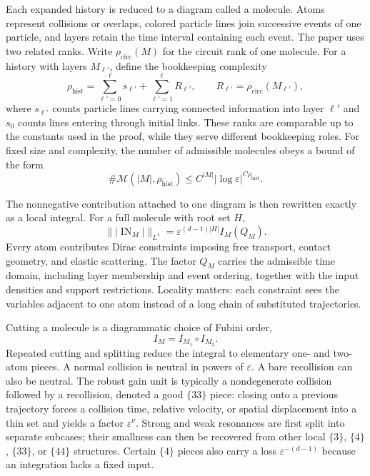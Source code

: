 Each expanded history is reduced to a diagram called a molecule.  Atoms represent collisions or
overlaps, colored particle lines join successive events of one particle, and layers retain the
time interval containing each event.  The paper uses two related ranks.  Write
$\rho_{\mathrm{circ}}(M)$ for the circuit rank of one molecule.  For a history with layers
$M_{\ell'}$, define the bookkeeping complexity
\begin{equation}
\rho_{\mathrm{hist}}
=\sum_{\ell'=0}^{\ell}s_{\ell'}
+\sum_{\ell'=1}^{\ell}R_{\ell'},
\qquad
R_{\ell'}=\rho_{\mathrm{circ}}(M_{\ell'}),
\label{eq:book-molecule-history-rank}
\end{equation}
where $s_{\ell'}$ counts particle lines carrying connected information into layer $\ell'$ and
$s_0$ counts lines entering through initial links.  These ranks are comparable up to the constants
used in the proof, while they serve different bookkeeping roles.  For fixed size and complexity,
the number of admissible molecules obeys a bound of the form
\begin{equation}
\#\mathcal M(|M|,\rho_{\mathrm{hist}})
\leq C^{|M|}|\log\varepsilon|^{C\rho_{\mathrm{hist}}}.
\label{eq:book-molecule-count}
\end{equation}

The nonnegative contribution attached to one diagram is then rewritten exactly as a local
integral.  For a full molecule with root set $H$,
\begin{equation}
\bigl\||\operatorname{IN}_M|\bigr\|_{L^1}
=\varepsilon^{(d-1)|H|} I_M(Q_M).
\label{eq:book-molecule-local-integral}
\end{equation}
Every atom contributes Dirac constraints imposing free transport, contact geometry, and elastic
scattering.  The factor $Q_M$ carries the admissible time domain, including layer membership and
event ordering, together with the input densities and support restrictions.  Locality matters:
each constraint sees the variables adjacent to one atom instead of a long chain of substituted
trajectories.

Cutting a molecule is a diagrammatic choice of Fubini order,
\begin{equation}
I_M=I_{M_1}\circ I_{M_2}.
\label{eq:book-molecule-fubini}
\end{equation}
Repeated cutting and splitting reduce the integral to elementary one- and two-atom pieces.  A
normal collision is neutral in powers of $\varepsilon$.  A bare recollision can also be neutral.
The robust gain unit is typically a nondegenerate collision followed by a recollision, denoted a
good $\{33\}$ piece: closing onto a previous trajectory forces a collision time, relative velocity,
or spatial displacement into a thin set and yields a factor $\varepsilon^\nu$.  Strong and weak
resonances are first split into separate subcases; their smallness can then be recovered from other
local $\{3\}$, $\{4\}$, $\{33\}$, or $\{44\}$ structures.  Certain $\{4\}$ pieces also carry a
loss $\varepsilon^{-(d-1)}$ because an integration lacks a fixed input.

